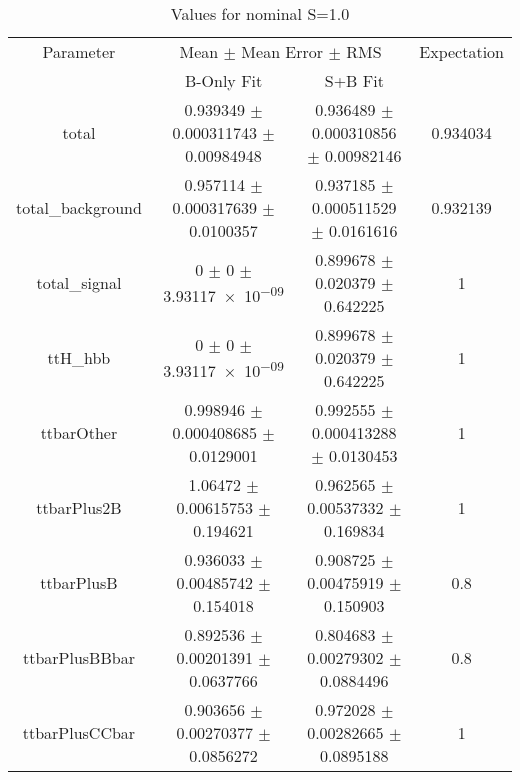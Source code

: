 \begin{table}
\centering
\caption{Values for nominal S=1.0}
\begin{tabular}{cccc}
\toprule
Parameter & \multicolumn{2}{c}{Mean $\pm$ Mean Error $\pm$ RMS} & Expectation\\
 & B-Only Fit & S+B Fit & \\
\midrule
total & \num{0.939349} $\pm$ \num{0.000311743} $\pm$ \num{0.00984948} & \num{0.936489} $\pm$ \num{0.000310856} $\pm$ \num{0.00982146} & \num{0.934034}\\
total\_background & \num{0.957114} $\pm$ \num{0.000317639} $\pm$ \num{0.0100357} & \num{0.937185} $\pm$ \num{0.000511529} $\pm$ \num{0.0161616} & \num{0.932139}\\
total\_signal & \num{0} $\pm$ \num{0} $\pm$ \num{3.93117e-09} & \num{0.899678} $\pm$ \num{0.020379} $\pm$ \num{0.642225} & \num{1}\\
ttH\_hbb & \num{0} $\pm$ \num{0} $\pm$ \num{3.93117e-09} & \num{0.899678} $\pm$ \num{0.020379} $\pm$ \num{0.642225} & \num{1}\\
ttbarOther & \num{0.998946} $\pm$ \num{0.000408685} $\pm$ \num{0.0129001} & \num{0.992555} $\pm$ \num{0.000413288} $\pm$ \num{0.0130453} & \num{1}\\
ttbarPlus2B & \num{1.06472} $\pm$ \num{0.00615753} $\pm$ \num{0.194621} & \num{0.962565} $\pm$ \num{0.00537332} $\pm$ \num{0.169834} & \num{1}\\
ttbarPlusB & \num{0.936033} $\pm$ \num{0.00485742} $\pm$ \num{0.154018} & \num{0.908725} $\pm$ \num{0.00475919} $\pm$ \num{0.150903} & \num{0.8}\\
ttbarPlusBBbar & \num{0.892536} $\pm$ \num{0.00201391} $\pm$ \num{0.0637766} & \num{0.804683} $\pm$ \num{0.00279302} $\pm$ \num{0.0884496} & \num{0.8}\\
ttbarPlusCCbar & \num{0.903656} $\pm$ \num{0.00270377} $\pm$ \num{0.0856272} & \num{0.972028} $\pm$ \num{0.00282665} $\pm$ \num{0.0895188} & \num{1}\\
\bottomrule
\end{tabular}
\end{table}